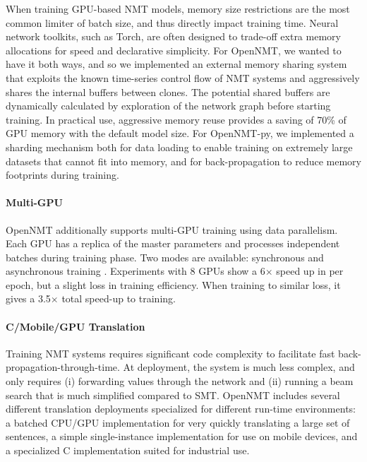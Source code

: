 \documentclass[]{article}
\begin{document}
When training GPU-based NMT models, memory size restrictions are the
most common limiter of batch size, and thus directly impact training
time. Neural network toolkits, such as Torch, are often designed to
trade-off extra memory allocations for speed and declarative
simplicity. For OpenNMT, we wanted to have it both ways, and so we
implemented an external memory sharing system that exploits the known
time-series control flow of NMT systems and aggressively shares the
internal buffers between clones. The potential shared buffers are
dynamically calculated by exploration of the network graph before
starting training. In practical use, aggressive memory reuse provides
a saving of 70\% of GPU memory with the default model size. For OpenNMT-py, we implemented a sharding mechanism both for data loading to enable training on extremely large datasets that cannot fit into memory, and for back-propagation to reduce memory footprints during training.

\paragraph{Multi-GPU} OpenNMT additionally supports multi-GPU training
using data parallelism. Each GPU has a replica of the master
parameters and processes independent batches during training phase.  Two
modes are available: synchronous and asynchronous training \citep{dean2012large}. Experiments with 8 GPUs show a 6$\times$ speed up in
per epoch, but a slight loss in training efficiency. When training to similar
loss, it gives a 3.5$\times$ total speed-up to training.



\paragraph{C/Mobile/GPU Translation} Training NMT systems requires
significant code complexity to facilitate fast
back-propagation-through-time. At deployment, the system is much less
complex, and only requires (i) forwarding values through the network
and (ii) running a beam search that is much simplified compared to
SMT. OpenNMT includes several different translation deployments
specialized for different run-time environments: a batched CPU/GPU
implementation for very quickly translating a large set of sentences,
a simple single-instance implementation for use on mobile devices, and
a specialized C implementation suited for industrial use.
\end{document}
